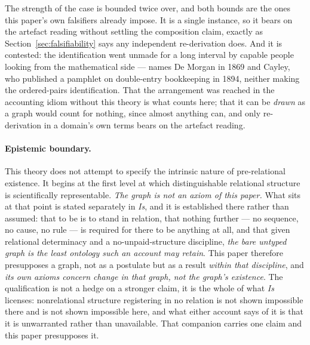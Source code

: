 \documentclass[11pt,a4paper]{article}
\theoremstyle{remark}\newtheorem{remark}[definition]{Remark}
\begin{document}
The strength of the case is bounded twice over, and both bounds are the ones this paper's own
falsifiers already impose. It is a single instance, so it bears on the artefact reading without settling
the composition claim, exactly as Section~\ref{sec:falsifiability} says any independent re-derivation
does. And it is contested: the identification went unmade for a long interval by capable people looking
from the mathematical side --- \citeauthor{ellerman2014} names De Morgan in 1869 and Cayley, who
published a pamphlet on double-entry bookkeeping in 1894, neither making the ordered-pairs
identification. That the arrangement was reached in the accounting idiom without this theory is what
counts here; that it can be \emph{drawn} as a graph would count for nothing, since almost anything can,
and only re-derivation in a domain's own terms bears on the artefact reading.

\paragraph{Epistemic boundary.}
This theory does not attempt to specify the intrinsic nature of pre-relational existence. It begins at the first level at which distinguishable relational structure is scientifically representable. \emph{The graph is not an axiom of this paper.} What sits at that point is stated separately in \emph{Is}, and it is established there rather than assumed: that to be is to stand in relation, that nothing further --- no sequence, no cause, no rule --- is required for there to be anything at all, and that given relational determinacy and a no-unpaid-structure discipline, \emph{the bare untyped graph is the least ontology such an account may retain}. This paper therefore presupposes a graph, not as a postulate but as a result \emph{within that discipline}, and \emph{its own axioms concern change in that graph, not the graph's existence}. The qualification is not a hedge on a stronger claim, it is the whole of what \emph{Is} licenses: nonrelational structure registering in no relation is not shown impossible there and is not shown impossible here, and what either account says of it is that it is unwarranted rather than unavailable. That companion carries one claim and this paper presupposes it.
\end{document}
